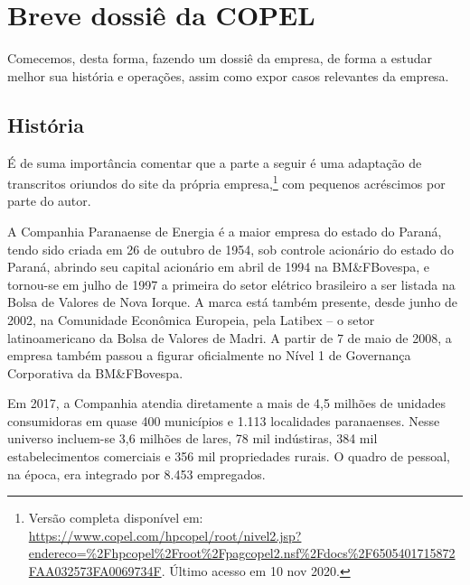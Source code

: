 \documentclass[grad,numbers]{coppe}
\begin{document}
  \hypertarget{breve-dossiuxea-da-copel}{%
  \section{Breve dossiê da COPEL}\label{breve-dossiuxea-da-copel}}

  Comecemos, desta forma, fazendo um dossiê da empresa, de forma a estudar melhor sua história e operações, assim como expor casos relevantes da empresa.

  \hypertarget{histuxf3ria}{%
  \subsection{História}\label{histuxf3ria}}

  É de suma importância comentar que a parte a seguir é uma adaptação de transcritos oriundos do site da própria empresa,\footnote{Versão completa disponível em: \url{https://www.copel.com/hpcopel/root/nivel2.jsp?endereco=\%2Fhpcopel\%2Froot\%2Fpagcopel2.nsf\%2Fdocs\%2F6505401715872FAA032573FA0069734F}. Último acesso em 10 nov 2020.} com pequenos acréscimos por parte do autor.

  A Companhia Paranaense de Energia é a maior empresa do estado do Paraná, tendo sido criada em 26 de outubro de 1954, sob controle acionário do estado do Paraná, abrindo seu capital acionário em abril de 1994 na BM\&FBovespa, e tornou-se em julho de 1997 a primeira do setor elétrico brasileiro a ser listada na Bolsa de Valores de Nova Iorque. A marca está também presente, desde junho de 2002, na Comunidade Econômica Europeia, pela Latibex -- o setor latinoamericano da Bolsa de Valores de Madri. A partir de 7 de maio de 2008, a empresa também passou a figurar oficialmente no Nível 1 de Governança Corporativa da BM\&FBovespa.

  Em 2017, a Companhia atendia diretamente a mais de 4,5 milhões de unidades consumidoras em quase 400 municípios e 1.113 localidades paranaenses. Nesse universo incluem-se 3,6 milhões de lares, 78 mil indústiras, 384 mil estabelecimentos comerciais e 356 mil propriedades rurais. O quadro de pessoal, na época, era integrado por 8.453 empregados.
\end{document}
